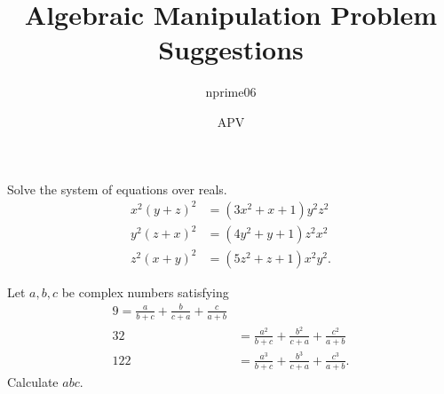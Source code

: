 \documentclass{article}
\title{Algebraic Manipulation Problem Suggestions}
\author{nprime06}
\date{APV}
\begin{document}
\maketitle

\begin{prob}{}
Solve the system of equations over reals. 
\begin{align*}
x^2(y+z)^2&=(3x^2+x+1)y^2z^2\\
y^2(z+x)^2&=(4y^2+y+1)z^2x^2\\
z^2(x+y)^2&=(5z^2+z+1)x^2y^2.
\end{align*}
\end{prob}

\begin{prob}[CMIMC 2017]{}
Let $a,b,c$ be complex numbers satisfying 
\begin{align*}
9=\frac a{b+c}+\frac b{c+a}+\frac c{a+b}\\ 
32 &= \frac{a^2}{b+c}+\frac{b^2}{c+a}+\frac{c^2}{a+b}\\ 
122&= \frac{ a^3}{b+c}+\frac{b^3}{c+a}+\frac{c^3}{a+b}.
\end{align*}
Calculate $abc$. 
\end{prob}
\end{document}
